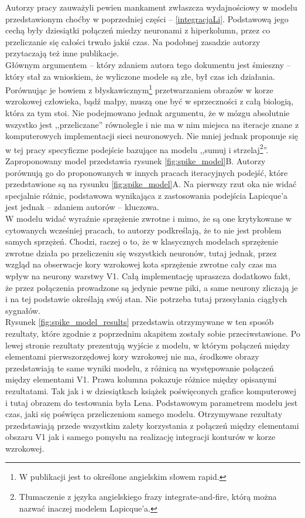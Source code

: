 Autorzy pracy \cite{Vanrullen2001} zauważyli pewien mankament zwłaszcza wydajnościowy w modelu przedstawionym choćby w poprzedniej części -- \ref{integracjaLi}. Podstawową jego cechą były dziesiątki połączeń miedzy neuronami z hiperkolumn, przez co przeliczanie się całości trwało jakiś czas. Na podobnej zasadzie autorzy przytaczają też inne publikacje.\\

Głównym argumentem -- który zdaniem autora tego dokumentu jest śmieszny -- który stał za wnioskiem, że wyliczone modele są złe, był czas ich działania. Porównując je bowiem z błyskawicznym\footnote{W publikacji jest to określone angielskim słowem rapid.} przetwarzaniem obrazów w korze wzrokowej człowieka, bądź małpy, muszą one być w sprzeczności z całą biologią, która za tym stoi. Nie podejmowano jednak argumentu, że w mózgu absolutnie wszystko jest ,,przeliczane'' równolegle i nie ma w nim miejsca na iteracje znane z komputerowych implementacji sieci neuronowych. Nie mniej jednak proponuje się w tej pracy specyficzne podejście bazujące na modelu ,,sumuj i strzelaj\footnote{Tłumaczenie z języka angielskiego frazy integrate-and-fire, którą można nazwać inaczej modelem Lapicque'a\cite{Lapicque}.}''. Zaproponowany model przedstawia rysunek \ref{fig:spike_model}B. Autorzy porównują go do proponowanych w innych pracach iteracyjnych podejść, które przedstawione są na rysunku \ref{fig:spike_model}A. Na pierwszy rzut oka nie widać specjalnie różnic, podstawowa wynikająca z zastosowania podejścia Lapicque'a jest jednak -- zdaniem autorów -- kluczowa.\\

W modelu widać wyraźnie sprzężenie zwrotne i mimo, że są one krytykowane w cytowanych wcześniej pracach, to autorzy podkreślają, że to nie jest problem samych sprzężeń. Chodzi, raczej o to, że w klasycznych modelach sprzężenie zwrotne działa po przeliczeniu się wszystkich neuronów, tutaj jednak, przez wzgląd na obserwacje kory wzrokowej kota sprzężenie zwrotne cały czas ma wpływ na neurony warstwy V1. Całą implementację upraszcza dodatkowo fakt, że przez połączenia prowadzone są jedynie pewne piki, a same neurony zliczają je i na tej podstawie określają swój stan. Nie potrzeba tutaj przesyłania ciągłych sygnałów.\\

Rysunek \ref{fig:spike_model_results} przedstawia otrzymywane w ten sposób rezultaty, które zgodnie z poprzednim akapitem zostały sobie przeciwstawione. Po lewej stronie rezultaty prezentują wyjście z modelu, w którym połączeń między elementami pierwszorzędowej kory wzrokowej nie ma, środkowe obrazy przedstawiają te same wyniki modelu, z różnicą na występowanie połączeń między elementami V1. Prawa kolumna pokazuje różnice między opisanymi rezultatami. Tak jak i w dziesiątkach książek poświęconych grafice komputerowej i tutaj obrazem do testowania była Lena. Podstawowym parametrem modelu jest czas, jaki się poświęca przeliczeniom samego modelu. Otrzymywane rezultaty przedstawiają przede wszystkim zalety korzystania z połączeń między elementami obszaru V1 jak i samego pomysłu na realizację integracji konturów w korze wzrokowej.\\

